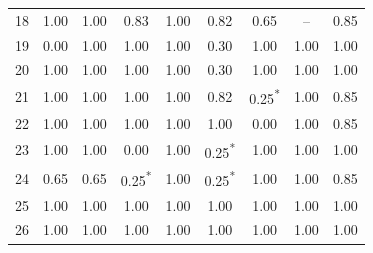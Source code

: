 \begin{table}[H]
{\begin{tabular}{c c c c c c c c c}
18 & 1.00 & 1.00 & 0.83 & 1.00 & 0.82 & 0.65 & -- & 0.85 \\
19 & 0.00 & 1.00 & 1.00 & 1.00 & 0.30 & 1.00 & 1.00 & 1.00 \\
20 & 1.00 & 1.00 & 1.00 & 1.00 & 0.30 & 1.00 & 1.00 & 1.00 \\
21 & 1.00 & 1.00 & 1.00 & 1.00 & 0.82 & 0.25\textsuperscript{*} & 1.00 & 0.85 \\
22 & 1.00 & 1.00 & 1.00 & 1.00 & 1.00 & 0.00 & 1.00 & 0.85 \\
23 & 1.00 & 1.00 & 0.00 & 1.00 & 0.25\textsuperscript{*} & 1.00 & 1.00 & 1.00 \\
24 & 0.65 & 0.65 & 0.25\textsuperscript{*} & 1.00 & 0.25\textsuperscript{*} & 1.00 & 1.00 & 0.85 \\
25 & 1.00 & 1.00 & 1.00 & 1.00 & 1.00 & 1.00 & 1.00 & 1.00 \\
26 & 1.00 & 1.00 & 1.00 & 1.00 & 1.00 & 1.00 & 1.00 & 1.00 \\
\bottomrule
\end{tabular}
}
\end{table}
